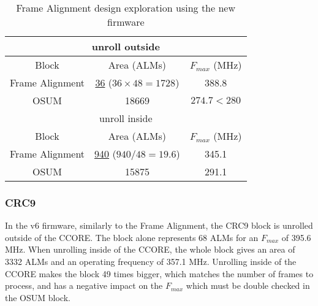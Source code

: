 \begin{itemize}
\begin{table}[ht]
    \centering
    \begin{tabular}{|c|c|c|}
        \hline
        \hline
        \multicolumn{3}{|c|}{unroll outside} \\
        \hline
        Block & Area (ALMs) & \(F_{max}\) (MHz) \\
        \hline
        Frame Alignment & \underline{36} (\(36\times48=1728\)) & 388.8 \\
        OSUM & 18669 & \(274.7 < 280\) \\
        \hline
        \hline
        \multicolumn{3}{|c|}{unroll inside} \\
        \hline
        Block & Area (ALMs) & \(F_{max}\) (MHz) \\
        \hline
        Frame Alignment & \underline{940} (\(940/48=19.6\))& 345.1\\
        OSUM & 15875 & 291.1\\
        \hline
    \end{tabular}
    \caption{Frame Alignment design exploration using the new firmware}
    \label{tab:new-frame-alignment-optimization}
\end{table}


\subsubsection{CRC9}

In the v6 firmware, similarly to the Frame Alignment, the CRC9 block is unrolled outside of the CCORE. The block alone represents 68 ALMs for an \(F_{max}\) of 395.6 MHz. When unrolling inside of the CCORE, the whole block gives an area of 3332 ALMs and an operating frequency of 357.1 MHz. Unrolling inside of the CCORE makes the block 49 times bigger, which matches the number of frames to process, and has a negative impact on the \(F_{max}\) which must be double checked in the OSUM block.


\end{itemize}
